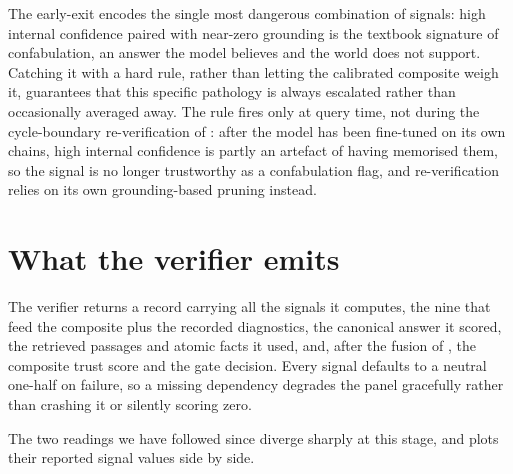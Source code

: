 \begin{precise}
The early-exit encodes the single most dangerous combination of signals: high
internal confidence paired with near-zero grounding is the textbook signature of
confabulation, an answer the model believes and the world does not support.
Catching it with a hard rule, rather than letting the calibrated composite weigh it,
guarantees that this specific pathology is always escalated rather than occasionally
averaged away. The rule fires only at query time, not during the cycle-boundary
re-verification of : after the model has been fine-tuned on its own
chains, high internal confidence is partly an artefact of having memorised them, so
the signal is no longer trustworthy as a confabulation flag, and re-verification
relies on its own grounding-based pruning instead.
\end{precise}

\section{What the verifier emits}
\label{sec:verifier-output}

The verifier returns a record carrying all the signals it computes, the nine that
feed the composite plus the recorded diagnostics, the canonical
answer it scored, the retrieved passages and atomic facts it used, and, after the
fusion of , the composite trust score and the gate decision. Every
signal defaults to a neutral one-half on failure, so a missing dependency degrades
the panel gracefully rather than crashing it or silently scoring zero.

The two readings we have followed since  diverge sharply at this
stage, and  plots their reported signal values side by side.

